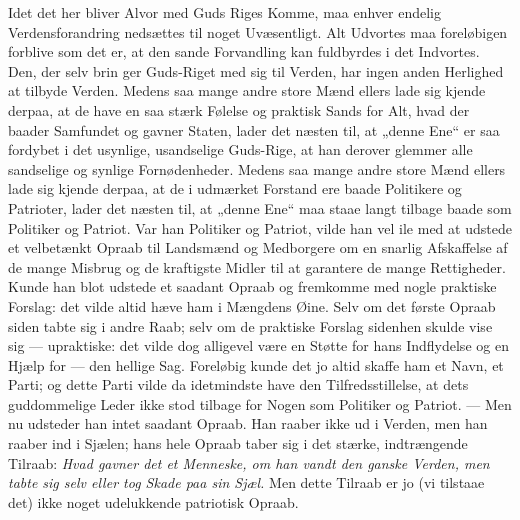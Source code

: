 \documentclass[12pt,a4paper]{book}
\begin{document}
Idet det her bliver Alvor med Guds Riges Komme, maa enhver endelig Verdensforandring
nedsættes til noget Uvæsentligt. Alt Udvortes maa foreløbigen forblive som det er, at
den sande Forvandling kan fuldbyrdes i det Indvortes. Den, der selv brin\-%
ger Guds-Riget med sig til Verden, har ingen anden Herlighed at tilbyde Verden. Medens
saa mange andre store Mænd ellers lade sig kjende derpaa, at de have en saa stærk
Følelse og praktisk Sands for Alt, hvad der baader Samfundet og gavner Staten, lader det
næsten til, at „denne Ene“ er saa fordybet i det usynlige, usandselige Guds-Rige, at han
derover glemmer alle sandselige og synlige Fornødenheder. Medens saa mange andre store
Mænd ellers lade sig kjende derpaa, at de i udmærket Forstand ere baade Politikere og
Patrioter, lader det næsten til, at „denne Ene“ maa staae langt tilbage baade som
Politiker og Patriot. Var han Politiker og Patriot, vilde han vel ile med at udstede et
velbetænkt Opraab til Landsmænd og Medborgere om en snarlig Afskaffelse af de mange
Misbrug og de kraftigste Midler til at garantere de mange Rettigheder. Kunde han blot
udstede et saadant Opraab og fremkomme med nogle praktiske Forslag: det vilde altid
hæve ham i Mængdens Øine. Selv om det første Opraab siden tabte sig i andre Raab; selv
om de praktiske Forslag sidenhen skulde vise sig --- upraktiske: det vilde dog alligevel
være en Støtte for hans Indflydelse og en Hjælp for --- den hellige Sag. Foreløbig kunde
det jo altid skaffe ham et Navn, et Parti; og dette Parti vilde da idetmindste have den
Tilfredsstillelse, at dets guddommelige Leder ikke stod tilbage for Nogen som Politiker
og Patriot. --- Men nu udsteder han intet saadant Opraab. Han raaber ikke ud i Verden,
men han raaber ind i Sjælen; hans hele Opraab taber sig i det stærke, indtrængende
Tilraab: \emph{Hvad gavner det et Menneske, om han vandt den ganske Verden, men tabte
sig selv eller tog Skade paa sin Sjæl.} Men dette Tilraab er jo (vi tilstaae det) ikke
noget udelukkende patriotisk Opraab.
\end{document}
